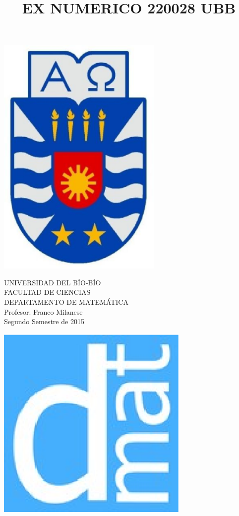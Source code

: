 \documentclass[11pt]{article}
\begin{document}
\title{EX NUMERICO 220028 UBB}

{\begin{minipage}{2cm}
\hspace*{1cm}\includegraphics[width=0.6\textwidth]{escubo-ubb.eps}
\end{minipage}
\begin{minipage}{12cm}
\small
{\bf \rm 
{
\begin{center}
{\footnotesize UNIVERSIDAD DEL B\'IO-B\'IO} \\
{\scriptsize FACULTAD DE CIENCIAS}  \\
{\scriptsize DEPARTAMENTO DE MATEM\'ATICA}  \\
{\scriptsize Profesor:  Franco Milanese}\\
{\scriptsize Segundo Semestre de 2015}
\end{center}
}}
\end{minipage}}
{\begin{minipage}{2cm}
\hspace*{-0.5cm}\vspace*{-0.05cm}\includegraphics[width=0.7\textwidth]{escudo-dmat.eps}
\end{minipage}}
\end{document}
